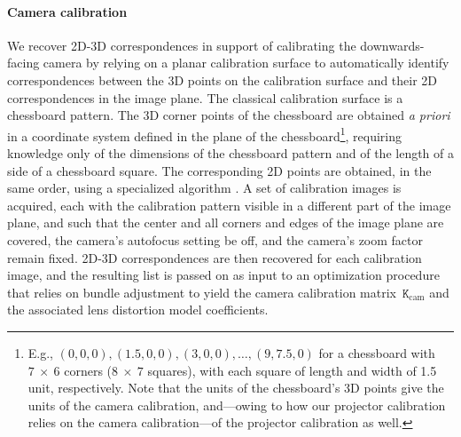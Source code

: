 \documentclass[review]{elsarticle}
\begin{document}
\paragraph{Camera calibration} We recover 2D-3D correspondences in support of calibrating the downwards-facing camera by relying on a planar calibration surface to automatically identify correspondences between the 3D points on the calibration surface and their 2D correspondences in the image plane. The classical calibration surface is a chessboard pattern. The 3D corner points of the chessboard are obtained \textit{a priori} in a coordinate system defined in the plane of the chessboard\footnote{E.g., $(0,0,0), (1.5,0,0), (3,0,0), \dots, (9,7.5,0)$ for a chessboard with $7~\times{}~6$ corners ($8~\times{}~7$ squares), with each square of length and width of 1.5 unit, respectively. Note that the units of the chessboard's 3D points give the units of the camera calibration, and---owing to how our projector calibration relies on the camera calibration---of the projector calibration as well.}, requiring knowledge only of the dimensions of the chessboard pattern and of the length of a side of a chessboard square. The corresponding 2D points are obtained, in the same order, using a specialized algorithm \cite{bradski2000opencv}. A set of calibration images is acquired, each with the calibration pattern visible in a different part of the image plane, and such that the center and all corners and edges of the image plane are covered, the camera's autofocus setting be off, and the camera's zoom factor remain fixed. 2D-3D correspondences are then recovered for each calibration image, and the resulting list is passed on as input to an optimization procedure that relies on bundle adjustment to yield the camera calibration matrix~$\mathtt{K}_\text{cam}$ and the associated lens distortion model coefficients. 
\end{document}
